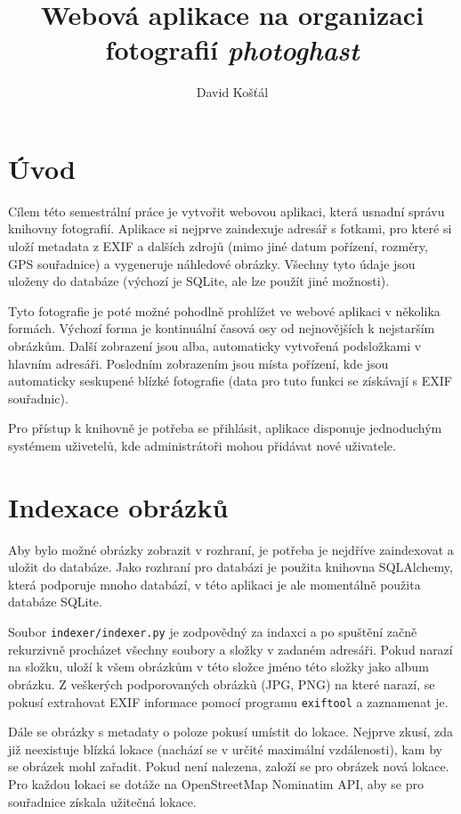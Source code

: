 \documentclass[czech]{template/pyt-report}
\title{Webová aplikace na organizaci fotografií \emph{photoghast}}
\author{David Košťál}
\affiliation{FIT ČVUT}
\begin{document}
\maketitle

\section{Úvod}
Cílem této semestrální práce je vytvořit webovou aplikaci, která usnadní správu
knihovny fotografií. Aplikace si nejprve zaindexuje adresář s fotkami, pro které
si uloží metadata z EXIF a dalších zdrojů (mimo jiné datum pořízení, rozměry,
GPS souřadnice) a vygeneruje náhledové obrázky. Všechny tyto údaje jsou uloženy do
databáze (výchozí je SQLite, ale lze použít jiné možnosti). 

Tyto fotografie je poté možné pohodlně prohlížet ve webové aplikaci v několika formách.
Výchozí forma je kontinuální časová osy od nejnovějších k nejstarším obrázkům.
Další zobrazení jsou alba, automaticky vytvořená podsložkami v hlavním adresáři.
Posledním zobrazením jsou místa pořízení, kde jsou automaticky seskupené blízké fotografie
(data pro tuto funkci se získávají s EXIF souřadnic).

Pro přístup k knihovně je potřeba se přihlásit, aplikace disponuje jednoduchým
systémem uživetelů, kde administrátoři mohou přidávat nové uživatele.
\section{Indexace obrázků}
Aby bylo možné obrázky zobrazit v rozhraní, je potřeba je nejdříve zaindexovat
a uložit do databáze. Jako rozhraní pro databázi je použita knihovna SQLAlchemy,
která podporuje mnoho databází, v této aplikaci je ale momentálně použita databáze
SQLite.

Soubor \verb+indexer/indexer.py+ je zodpovědný za indaxci a po spuštění začně
rekurzivně procházet všechny soubory a složky v zadaném adresáři. Pokud narazí
na složku, uloží k všem obrázkům v této složce jméno této složky jako album obrázku.
Z veškerých podporovaných obrázků (JPG, PNG) na které narazí, se pokusí extrahovat
EXIF informace pomocí programu \verb+exiftool+ a zaznamenat je.

Dále se obrázky s metadaty o poloze pokusí umístit do lokace. Nejprve zkusí, zda
již neexistuje blízká lokace (nachází se v určité maximální vzdálenosti),
kam by se obrázek mohl zařadit. Pokud není nalezena, založí se pro obrázek nová lokace.
Pro každou lokaci se dotáže na OpenStreetMap Nominatim API, aby se pro souřadnice
získala užitečná lokace.
\end{document}
